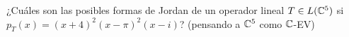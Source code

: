 \item ¿Cuáles son las posibles formas de Jordan de un operador lineal $T\in L(\mathbb{C}^5)$ si $p_T(x)=(x+4)^2(x-\pi)^2(x-i)$? (pensando a $\mathbb{C}^5$ como $\mathbb{C}$-EV)
    \begin{mdframed}[style=s]
        
    \end{mdframed}